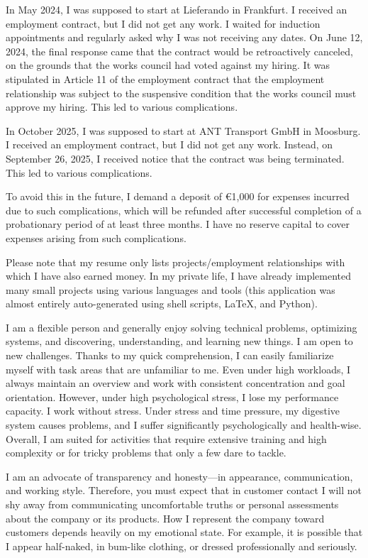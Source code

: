 \documentclass[fromphone,parskip=half]{scrlttr2}%
\begin{document}
\begin{letter}
		In May 2024, I was supposed to start at Lieferando in Frankfurt.  
		I received an employment contract, but I did not get any work.  
		I waited for induction appointments and regularly asked why I was not receiving any dates.  
		On June 12, 2024, the final response came that the contract would be retroactively canceled, on the grounds that the works council had voted against my hiring.  
		It was stipulated in Article 11 of the employment contract that the employment relationship was subject to the suspensive condition that the works council must approve my hiring.  
		This led to various complications.

		In October 2025, I was supposed to start at ANT Transport GmbH in Moosburg.  
		I received an employment contract, but I did not get any work.  
		Instead, on September 26, 2025, I received notice that the contract was being terminated.  
		This led to various complications.

		To avoid this in the future, I demand a deposit of €1,000 for expenses incurred due to such complications, which will be refunded after successful completion of a probationary period of at least three months.  
		I have no reserve capital to cover expenses arising from such complications.

		Please note that my resume only lists projects/employment relationships with which I have also earned money.  
		In my private life, I have already implemented many small projects using various languages and tools (this application was almost entirely auto-generated using shell scripts, LaTeX, and Python).

		I am a flexible person and generally enjoy solving technical problems, optimizing systems, and discovering, understanding, and learning new things.  
		I am open to new challenges.  
		Thanks to my quick comprehension, I can easily familiarize myself with task areas that are unfamiliar to me.  
		Even under high workloads, I always maintain an overview and work with consistent concentration and goal orientation.  
		However, under high psychological stress, I lose my performance capacity.  
		I work without stress.  
		Under stress and time pressure, my digestive system causes problems, and I suffer significantly psychologically and health-wise.  
		Overall, I am suited for activities that require extensive training and high complexity or for tricky problems that only a few dare to tackle.

		I am an advocate of transparency and honesty—in appearance, communication, and working style.
		Therefore, you must expect that in customer contact I will not shy away from communicating uncomfortable truths or personal assessments about the company or its products.
		How I represent the company toward customers depends heavily on my emotional state.
		For example, it is possible that I appear half-naked, in bum-like clothing, or dressed professionally and seriously.


\end{letter}
\end{document}
